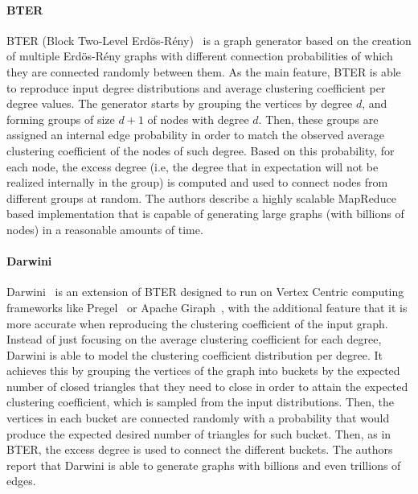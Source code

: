 \paragraph{BTER} BTER (Block Two-Level
Erd\"{o}s-R\'{e}ny)~\cite{kolda2014scalable} is a graph generator based on the
creation of multiple Erd\"{o}s-R\'{e}ny graphs with different connection
probabilities  of which they are connected randomly between them. As the main feature, BTER is able
to reproduce input degree distributions and average clustering
coefficient per degree values. The generator starts by grouping the vertices
by degree $d$, and forming groups of size $d+1$ of nodes with degree $d$. Then, these
groups are assigned an internal edge probability in order to match the observed
average clustering coefficient of the nodes of such degree. Based on this
probability, for each node, the excess degree (i.e, the degree that in
expectation will not be realized internally in the group) is computed and used to connect
nodes from different groups at random. The authors describe a highly scalable
MapReduce based implementation that is capable of generating large graphs (with
billions of nodes) in a reasonable amounts of time.

\paragraph{Darwini} Darwini~\cite{edunov2016darwini} is an extension of BTER
designed to run on Vertex Centric computing frameworks like
Pregel~\cite{malewicz2010pregel} or Apache Giraph~\cite{ching2015one}, with the
additional feature that it is more accurate when reproducing the clustering
coefficient of the input graph. Instead of just focusing on the average
clustering coefficient for each degree, Darwini is able to model the clustering
coefficient distribution per degree. It achieves this by grouping the vertices
of the graph into buckets by the expected number of closed triangles that they need
to close in order to attain the expected clustering coefficient, which is
sampled from the input distributions. Then, the vertices in each bucket are
connected randomly with a probability that would produce the expected
desired number of triangles for such bucket. Then, as in BTER, the excess degree
is used to connect the different buckets. The authors report that Darwini is
able to generate graphs with billions and even trillions of edges.




